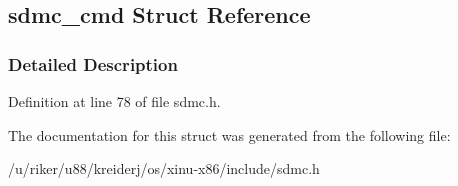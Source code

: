\hypertarget{structsdmc__cmd}{}\subsection{sdmc\+\_\+cmd Struct Reference}
\label{structsdmc__cmd}


\subsubsection{Detailed Description}


Definition at line 78 of file sdmc.\+h.



The documentation for this struct was generated from the following file\+:\begin{DoxyCompactItemize}
\item 
/u/riker/u88/kreiderj/os/xinu-\/x86/include/sdmc.\+h\end{DoxyCompactItemize}
